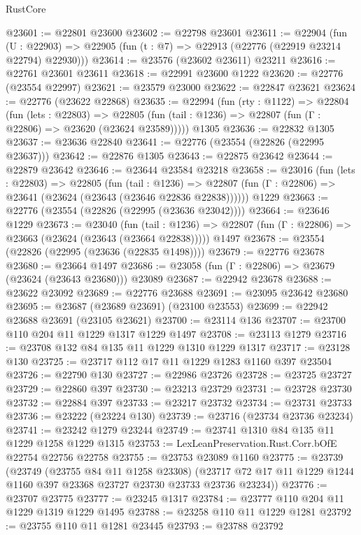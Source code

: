 \begin{lexlean}{RustCore}
\begin{coremodule}
@23601 := @22801 @23600
@23602 := @22798 @23601
@23611 := @22904
    (fun (U : @22903) => @22905 (fun (t : @7) => @22913 (@22776 (@22919 @23214 @22794) @22930)))
@23614 := @23576 (@23602 @23611) @23211
@23616 := @22761 @23601 @23611
@23618 := @22991 @23600 @1222
@23620 := @22776 (@23554 @22997)
@23621 := @23579 @23000
@23622 := @22847 @23621
@23624 := @22776 (@23622 @22868)
@23635 := @22994
    (fun (rty : @1122) =>
    @22804
      (fun (lets : @22803) =>
      @22805 (fun (tail : @1236) => @22807 (fun (Γ : @22806) => @23620 (@23624 @23589)))))
    @1305
@23636 := @22832 @1305
@23637 := @23636 @22840
@23641 := @22776 (@23554 (@22826 (@22995 @23637)))
@23642 := @22876 @1305
@23643 := @22875 @23642
@23644 := @22879 @23642
@23646 := @23644 @23584 @23218
@23658 := @23016
    (fun (lets : @22803) =>
    @22805
      (fun (tail : @1236) =>
      @22807 (fun (Γ : @22806) => @23641 (@23624 (@23643 (@23646 @22836 @22838))))))
    @1229
@23663 := @22776 (@23554 (@22826 (@22995 (@23636 @23042))))
@23664 := @23646 @1229
@23673 := @23040
    (fun (tail : @1236) => @22807 (fun (Γ : @22806) => @23663 (@23624 (@23643 (@23664 @22838)))))
    @1497
@23678 := @23554 (@22826 (@22995 (@23636 (@22835 @1498))))
@23679 := @22776 @23678
@23680 := @23664 @1497
@23686 := @23058 (fun (Γ : @22806) => @23679 (@23624 (@23643 @23680))) @23089
@23687 := @22942 @23678
@23688 := @23622 @23092
@23689 := @22776 @23688
@23691 := @23095 @23642 @23680
@23695 := @23687 (@23689 @23691) (@23100 @23553)
@23699 := @22942 @23688 @23691 (@23105 @23621)
@23700 := @23114 @136
@23707 := @23700 @110 @204 @11 @1229 @1317 @1229 @1497
@23708 := @23113 @1279
@23716 := @23708 @132 @84 @135 @11 @1229 @1310 @1229 @1317
@23717 := @23128 @130
@23725 := @23717 @112 @17 @11 @1229 @1283 @1160 @397 @23504
@23726 := @22790 @130
@23727 := @22986 @23726
@23728 := @23725 @23727
@23729 := @22860 @397
@23730 := @23213 @23729
@23731 := @23728 @23730
@23732 := @22884 @397
@23733 := @23217 @23732
@23734 := @23731 @23733
@23736 := @23222 (@23224 @130)
@23739 := @23716 (@23734 @23736 @23234)
@23741 := @23242 @1279 @23244
@23749 := @23741 @1310 @84 @135 @11 @1229 @1258 @1229 @1315
@23753 := LexLeanPreservation.Rust.Corr.bOfE @22754 @22756 @22758
@23755 := @23753 @23089 @1160
@23775 := @23739
    (@23749
      (@23755 @84 @11 @1258 @23308)
      (@23717 @72 @17 @11 @1229 @1244 @1160 @397 @23368 @23727 @23730 @23733 @23736 @23234))
@23776 := @23707 @23775
@23777 := @23245 @1317
@23784 := @23777 @110 @204 @11 @1229 @1319 @1229 @1495
@23788 := @23258 @110 @11 @1229 @1281
@23792 := @23755 @110 @11 @1281 @23445
@23793 := @23788 @23792

\end{coremodule}
\end{lexlean}
